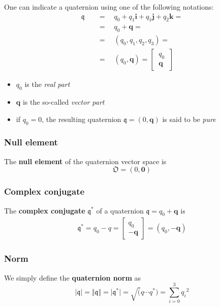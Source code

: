 One can indicate a quaternion using one of the following notations:
{\large{
    \begin{align*}
        \mathfrak{q} \quad &= \quad q_0+q_1\mathbf{i}+q_1\mathbf{j}+q_2\mathbf{k}=\\
                     &= \quad q_0+\mathbf{q}=\\
                     &=\quad (q_0, q_1, q_2, q_3)=\\
                     &=\quad  (q_0, \mathbf{q})=\begin{bmatrix}
                        \ q_0 \ \\\ \mathbf{q} \
                     \end{bmatrix}
    \end{align*}
}}

\begin{itemize}
    \itemsep0em
    \item $q_0$ is the \textit{real part}
    \item $\mathbf{q}$ is the so-called \textit{vector part}
    \item if $q_0=0$, the resulting quaternion $\mathfrak{q}=(0,\mathbf{q})$ is said to be \textit{pure}
\end{itemize}

{\color{red} \subsubsection*{Null element}}
\noindent
The \textbf{null element} of the quaternion vector space is
{\Large{
    \begin{equation*}
        \mathfrak{O} = (0, \mathbf{0})
    \end{equation*}
}
}

{\color{red} \subsubsection*{Complex conjugate}}
\noindent
The \textbf{complex conjugate} $\mathfrak{q}^*$ of a quaternion $\mathfrak{q}=q_0+\mathbf{q}$ is
{\Large{
    \begin{align*}
        \mathfrak{q}^*=q_0-q=\begin{bmatrix}
            q_0\\-\mathbf{q}
        \end{bmatrix}=(q_0, -\mathbf{q})
    \end{align*}
}} 

{\color{red} \subsubsection*{Norm}}
\noindent
We simply define the \textbf{quaternion norm} as
{\Large{
    \begin{equation*}
        \vert \mathfrak{q} \vert = \Vert \mathfrak{q} \Vert = \vert \mathfrak{q}^* \vert=\sqrt(q \cdots q^* )=
        \sum_{i=0}^3 {q_i}^2
    \end{equation*}
}}

